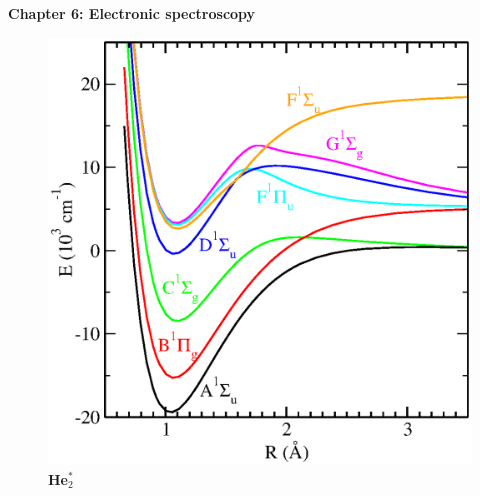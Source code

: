 \renewcommand{\theequation}{6.\arabic{equation}}

\begin{frame}
\begin{center}
{\bf Chapter 6: Electronic spectroscopy}\\
\end{center}

\begin{figure}
\centering
\includegraphics[scale=0.3]{figs/he2-singlet}\\
\hspace{0.8cm}\textbf{He$_2^*$}
\end{figure}
\end{frame}

\scriptsize










